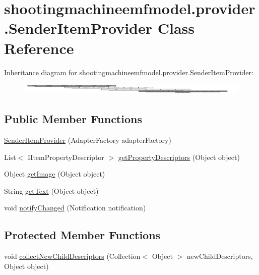 \hypertarget{classshootingmachineemfmodel_1_1provider_1_1_sender_item_provider}{\section{shootingmachineemfmodel.\-provider.\-Sender\-Item\-Provider Class Reference}
\label{classshootingmachineemfmodel_1_1provider_1_1_sender_item_provider}
}
Inheritance diagram for shootingmachineemfmodel.\-provider.\-Sender\-Item\-Provider\-:\begin{figure}[H]
\begin{center}
\leavevmode
\includegraphics[height=0.534759cm]{classshootingmachineemfmodel_1_1provider_1_1_sender_item_provider}
\end{center}
\end{figure}
\subsection*{Public Member Functions}
\begin{DoxyCompactItemize}
\item 
\hyperlink{classshootingmachineemfmodel_1_1provider_1_1_sender_item_provider_a8c604aed09f22b7e18380bcddcbc7ffc}{Sender\-Item\-Provider} (Adapter\-Factory adapter\-Factory)
\item 
List$<$ I\-Item\-Property\-Descriptor $>$ \hyperlink{classshootingmachineemfmodel_1_1provider_1_1_sender_item_provider_ab28042f41bbe23f0477347c386a38aae}{get\-Property\-Descriptors} (Object object)
\item 
Object \hyperlink{classshootingmachineemfmodel_1_1provider_1_1_sender_item_provider_a751e66d3877f1b09cf5ab030ea2bf11e}{get\-Image} (Object object)
\item 
String \hyperlink{classshootingmachineemfmodel_1_1provider_1_1_sender_item_provider_ae726793b3c9c3a1954c85c7af095521c}{get\-Text} (Object object)
\item 
void \hyperlink{classshootingmachineemfmodel_1_1provider_1_1_sender_item_provider_aa6bafbbfe04cf87c75a51c259b16c852}{notify\-Changed} (Notification notification)
\end{DoxyCompactItemize}
\subsection*{Protected Member Functions}
\begin{DoxyCompactItemize}
\item 
void \hyperlink{classshootingmachineemfmodel_1_1provider_1_1_sender_item_provider_a50f4d072951b75d7bedcbfc53eccd313}{collect\-New\-Child\-Descriptors} (Collection$<$ Object $>$ new\-Child\-Descriptors, Object object)
\end{DoxyCompactItemize}


